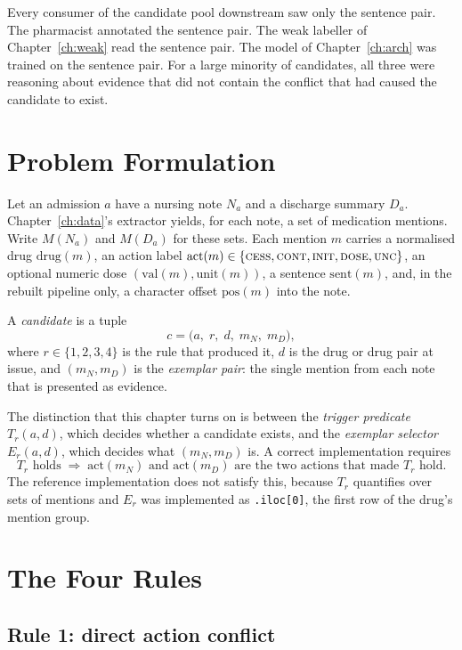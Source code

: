 Every consumer of the candidate pool downstream saw only the sentence pair. The
pharmacist annotated the sentence pair. The weak labeller of
Chapter~\ref{ch:weak} read the sentence pair. The model of
Chapter~\ref{ch:arch} was trained on the sentence pair. For a large minority of
candidates, all three were reasoning about evidence that did not contain the
conflict that had caused the candidate to exist.

\section{Problem Formulation}
\label{sec:cand-formulation}

Let an admission $a$ have a nursing note $N_a$ and a discharge summary $D_a$.
Chapter~\ref{ch:data}'s extractor yields, for each note, a set of medication
mentions. Write $M(N_a)$ and $M(D_a)$ for these sets. Each mention
$m$ carries a normalised drug $\mathrm{drug}(m)$, an action label
$\mathrm{act}(m) \in \{\textsc{cess}, \textsc{cont}, \textsc{init},
\textsc{dose}, \textsc{unc}\}$, an optional numeric dose
$(\mathrm{val}(m), \mathrm{unit}(m))$, a sentence $\mathrm{sent}(m)$, and, in
the rebuilt pipeline only, a character offset $\mathrm{pos}(m)$ into the note.

A \emph{candidate} is a tuple
\[
c = \bigl(a,\; r,\; d,\; m_N,\; m_D\bigr),
\]
where $r \in \{1,2,3,4\}$ is the rule that produced it, $d$ is the drug or drug
pair at issue, and $(m_N, m_D)$ is the \emph{exemplar pair}: the single mention
from each note that is presented as evidence.

The distinction that this chapter turns on is between the \emph{trigger
predicate} $T_r(a, d)$, which decides whether a candidate exists, and the
\emph{exemplar selector} $E_r(a, d)$, which decides what $(m_N, m_D)$ is. A
correct implementation requires
\[
T_r \text{ holds} \;\Longrightarrow\; \mathrm{act}(m_N) \text{ and }
\mathrm{act}(m_D) \text{ are the two actions that made } T_r \text{ hold}.
\]
The reference implementation does not satisfy this, because $T_r$ quantifies
over sets of mentions and $E_r$ was implemented as
\texttt{.iloc[0]}, the first row of the drug's mention group.

\section{The Four Rules}
\label{sec:rules}

\subsection{Rule 1: direct action conflict}

